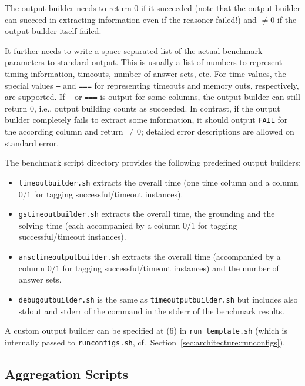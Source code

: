 \documentclass[a4paper]{article}
\begin{document}
			The output builder needs to return $0$ if it succeeded (note that the output builder can succeed in extracting information even if the reasoner failed!)
			and $\not=0$ if the output builder itself failed.
			
			It further needs to write a space-separated list of the actual benchmark parameters to standard output.
			This is usually a list of numbers to represent timing information, timeouts, number of answer sets, etc. For time values,
			the special values {\tt ---} and {\tt ===} for representing timeouts and memory outs, respectively, are supported.
			If {\tt ---} or {\tt ===} is output for some columns, the output builder can still return $0$, i.e.,
			output building counts as succeeded.
			In contrast, if the output builder completely fails to extract some information, it should output {\tt FAIL} for the according column
			and return $\not=0$; detailed error descriptions are allowed on standard error.
			
			The benchmark script directory provides the following predefined output builders:
					
			\begin{itemize}
			    \item {\tt timeoutbuilder.sh} extracts the overall time (one time column and a column $0/1$ for tagging successful/timeout instances).
			    \item {\tt gstimeoutbuilder.sh} extracts the overall time, the grounding and the solving time (each accompanied by a column $0/1$ for tagging successful/timeout instances).
			    \item {\tt ansctimeoutputbuilder.sh} extracts the overall time (accompanied by a column $0/1$ for tagging successful/timeout instances) and the number of answer sets.
                            \item {\tt debugoutbuilder.sh} is the same as {\tt timeoutputbuilder.sh} but includes also stdout and stderr of the command in the stderr of the benchmark results.
			\end{itemize}

			A custom output builder can be specified at (6) in {\tt run\_template.sh} (which is internally passed to {\tt runconfigs.sh}, cf.~Section~\ref{sec:architecture:runconfigs}).

		\subsection{Aggregation Scripts}
		\label{sec:architecture:aggregate}
\end{document}
